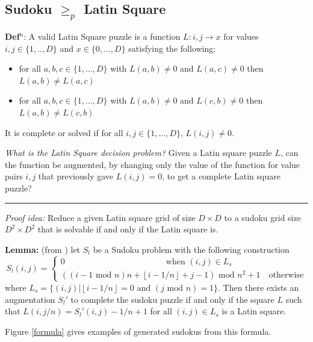 \documentclass[a4paper,11pt]{report}
\newcounter{row}
\begin{document}
\subsection{Sudoku $\geq_p$ Latin Square}

\textbf{Def$^n$}: A valid Latin Square puzzle is a function $L:i,j \rightarrow x$ for values $i,j \in \{1,..,D\} $ and $x \in
\{0,...,D\}$ satisfying the following:
\begin{itemize}
\item{for all $a,b,c \in \{1,...,D\}$ with $L(a,b) \neq 0 $ and $L(a,c) \neq 0$ then $L(a,b) \neq L(a,c)$}
\item{for all $a,b,c \in \{1,...,D\}$ with $L(a,b) \neq 0 $ and $L(c,b) \neq 0$ then $L(a,b) \neq L(c,b)$}
\end{itemize}
It is complete or solved if for all $i,j \in \{1,...,D\}$, $L(i,j) \neq 0$.

\textit{What is the Latin Square decision problem?} Given a Latin square puzzle $L$, can the function be augmented, by changing only the value of the function for value pairs $i,j$ that previously gave $L(i,j) =0$, to get a complete Latin square puzzle?

\noindent\rule{4cm}{0.4pt}

\textit{Proof idea:} Reduce a given Latin square grid of size $D \times D$ to a sudoku grid size $D^2 \times D^2$ that is solvable if and only if the Latin square is.

\textbf{Lemma:} (from \cite{sls}) let $S_l$ be a Sudoku problem with the following construction 
\begin{equation}
S_l(i,j) =\begin{cases}
0 \qquad\qquad\qquad\qquad\qquad\qquad\text{when } (i,j) \in L_s \\ 
((i-1 \text{ mod } n)n + \left\lfloor{i-1/n}\right\rfloor+j-1)\text{ mod } n^2 +1 \quad\text{otherwise}
\end{cases}
\end{equation}
where $L_s=\{(i,j)| \left\lfloor{i-1/n}\right\rfloor=0 \text{ and }(j \text{ mod }n)=1\}$. Then there exists an augmentation $S_l'$ to complete the sudoku puzzle if and only if the square $L$ such that $L(i,j/n)=S_l'(i,j)-1/n+1$ for all $(i,j) \in L_s$ is a Latin square.

Figure \ref{formula} gives examples of generated sudokus from this formula.
\end{document}
